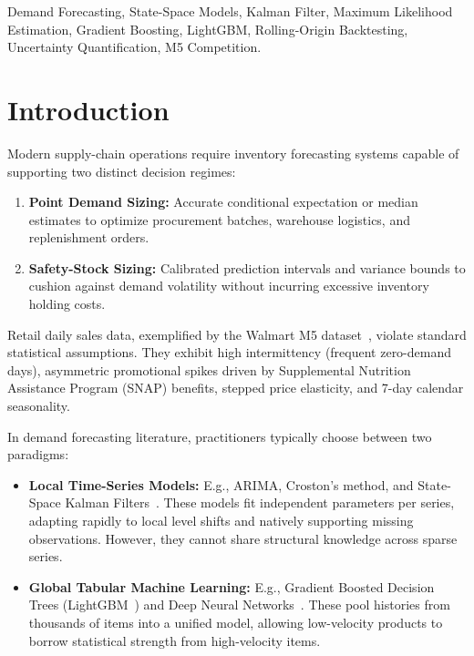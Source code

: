 \documentclass[conference]{IEEEtran}
\begin{document}
\begin{IEEEkeywords}
Demand Forecasting, State-Space Models, Kalman Filter, Maximum Likelihood Estimation, Gradient Boosting, LightGBM, Rolling-Origin Backtesting, Uncertainty Quantification, M5 Competition.
\end{IEEEkeywords}

\section{Introduction}
Modern supply-chain operations require inventory forecasting systems capable of supporting two distinct decision regimes:
\begin{enumerate}
    \item \textbf{Point Demand Sizing:} Accurate conditional expectation or median estimates to optimize procurement batches, warehouse logistics, and replenishment orders.
    \item \textbf{Safety-Stock Sizing:} Calibrated prediction intervals and variance bounds to cushion against demand volatility without incurring excessive inventory holding costs.
\end{enumerate}

Retail daily sales data, exemplified by the Walmart M5 dataset~\cite{b5}, violate standard statistical assumptions. They exhibit high intermittency (frequent zero-demand days), asymmetric promotional spikes driven by Supplemental Nutrition Assistance Program (SNAP) benefits, stepped price elasticity, and 7-day calendar seasonality.

In demand forecasting literature, practitioners typically choose between two paradigms:
\begin{itemize}
    \item \textbf{Local Time-Series Models:} E.g., ARIMA, Croston's method, and State-Space Kalman Filters~\cite{b1,b3}. These models fit independent parameters per series, adapting rapidly to local level shifts and natively supporting missing observations. However, they cannot share structural knowledge across sparse series.
    \item \textbf{Global Tabular Machine Learning:} E.g., Gradient Boosted Decision Trees (LightGBM~\cite{b4}) and Deep Neural Networks~\cite{b2}. These pool histories from thousands of items into a unified model, allowing low-velocity products to borrow statistical strength from high-velocity items.
\end{itemize}
\end{document}

